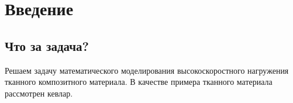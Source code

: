 \chapter{Введение}\label{ch:intro}

\section*{Что за задача?}

Решаем задачу математического моделирования высокоскоростного нагружения тканного композитного материала.
В качестве примера тканного материала рассмотрен кевлар.

